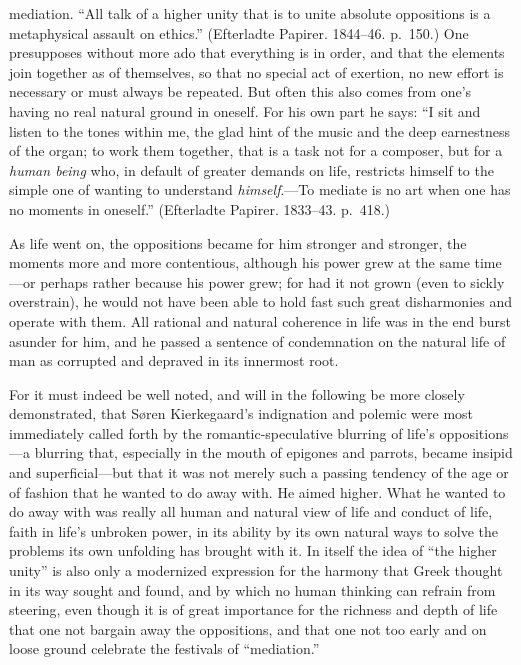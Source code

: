 \documentclass[12pt,a4paper]{book}
\newcommand{\opage}[1]{\marginnote{\footnotesize\textit{[#1]}}}
\begin{document}
mediation. ``All talk of a higher unity that is to unite absolute
oppositions is a metaphysical assault on ethics.'' (Efterladte Papirer.
1844--46. p.~150.) One presupposes without more ado that everything is in
order, and that the elements join together as of themselves, so that no
special act of exertion, no new effort is necessary or must always be
repeated. But often this also comes from one's having no real natural
ground in oneself. For his own part he says: ``I sit and listen to the
tones within me, the glad hint of the music and the deep earnestness of
the organ; to work them together, that is a task not for a composer, but
for a \textit{human being} who, in default of greater demands on life,
restricts himself to the simple one of wanting to understand
\textit{himself}.---To mediate is no art when one has no moments in
oneself.'' (Efterladte Papirer. 1833--43. p.~418.)

As life went on, the oppositions became for him
\opage{47}stronger and stronger, the moments more and more contentious,
although his power grew at the same time---or perhaps rather because his
power grew; for had it not grown (even to sickly overstrain), he would
not have been able to hold fast such great disharmonies and operate with
them. All rational and natural coherence in life was in the end burst
asunder for him, and he passed a sentence of condemnation on the natural
life of man as corrupted and depraved in its innermost root.

For it must indeed be well noted, and will in the following be more
closely demonstrated, that Søren Kierkegaard's indignation and polemic
were most immediately called forth by the romantic-speculative blurring
of life's oppositions---a blurring that, especially in the mouth of
epigones and parrots, became insipid and superficial---but that it was
not merely such a passing tendency of the age or of fashion that he
wanted to do away with. He aimed higher. What he wanted to do away with
was really all human and natural view of life and conduct of life, faith
in life's unbroken power, in its ability by its own natural ways to solve
the problems its own unfolding has brought with it. In itself the idea
of ``the higher unity'' is also only a modernized expression for the
harmony that Greek thought in its way sought and found, and by which no
human thinking can refrain from steering, even though it is of great
importance for the richness and depth of life that one not bargain away
the oppositions, and that one not too early and on loose ground celebrate
the festivals of ``mediation.''
\end{document}
